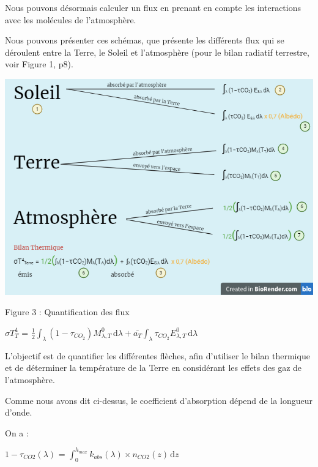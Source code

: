 \documentclass[a4paper, 12pt]{report} %
\begin{document}
Nous pouvons désormais calculer un flux en prenant en compte les interactions avec les molécules de l’atmosphère.

Nous pouvons présenter ces schémas, que présente les différents flux qui se déroulent entre la Terre, le Soleil et l'atmosphère (pour le bilan radiatif terrestre, voir Figure 1, p8).\vspace{\baselineskip}  

\begin{center}
    \includegraphics[scale=0.35]{Images/schemafluxformules.png}
    
    Figure 3 : Quantification des flux
\end{center} \vspace{\baselineskip}

$\sigma T_T^4$ = $\frac{1}{2} \int_{\lambda}^{} (1-\tau_{CO_2})M^{0}_{\lambda,T} \, \mathrm{d}\lambda 
                + \bar{a_T} \int_{\lambda}^{} \tau_{CO_2}E^{0}_{\lambda,T} \, \mathrm{d}\lambda$ \vspace{\baselineskip}

L’objectif est de quantifier les différentes flèches, afin d’utiliser le bilan thermique et de déterminer la température de la Terre en considérant les effets des gaz de l’atmosphère.

\noindent Comme nous avons dit ci-dessus, le coefficient d'absorption dépend de la longueur d’onde. 

\noindent On a : 
\begin{center}
    $1-\tau_{CO2}(\lambda)$ = $\int_{0}^{h_{max}} k_{abs}(\lambda) \times n_{CO2}(z) \, \mathrm{d}z$
\end{center}
\end{document}
